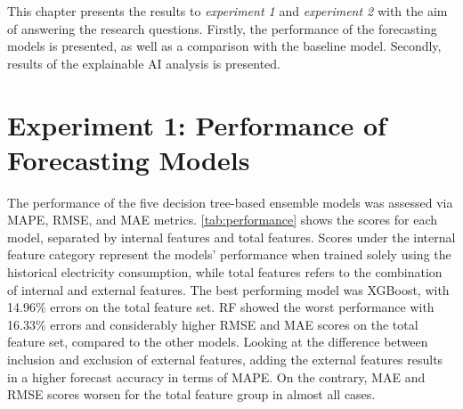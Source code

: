 This chapter presents the results to \emph{experiment 1} and \emph{experiment 2} with the aim of answering the research questions. Firstly, the performance of the forecasting models is presented, as well as a comparison with the baseline model. Secondly, results of the explainable AI analysis is presented.

\section{Experiment 1: Performance of Forecasting Models}
The performance of the five decision tree-based ensemble models was assessed via MAPE, RMSE, and MAE metrics. \autoref{tab:performance} shows the scores for each model, separated by internal features and total features. Scores under the internal feature category represent the models' performance when trained solely using the historical electricity consumption, while total features refers to the combination of internal and external features. The best performing model was XGBoost, with 14.96\% errors on the total feature set. RF showed the worst performance with 16.33\% errors and considerably higher RMSE and MAE scores on the total feature set, compared to the other models. Looking at the difference between inclusion and exclusion of external features, adding the external features results in a higher forecast accuracy in terms of MAPE. On the contrary, MAE and RMSE scores worsen for the total feature group in almost all cases.

